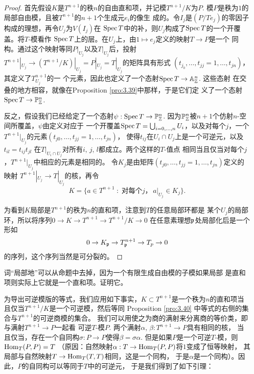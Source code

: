 \begin{proof}
	首先假设$K$是$T^{n+1}$的秩$n$的自由直和项，并记模$T^{n+1}/K$为$P$. 
	模$P$是秩为$1$的局部自由模，且被$T^{n+1}$的$n+1$个生成元$e_i$的像生
	成的。令$I_j$是$(P/Te_j)$的零因子构成的理想，再令$U_j$为$V(I_j)$在
	$\operatorname{Spec} T$中的补，则$U_j$构成了$\operatorname{Spec} T$的一个开覆盖。将$T$-模看作
	$\operatorname{Spec} T$上的层。在$U_j$上，由$1\mapsto e_j$定义的映射$T\to P$是一个
	同构。通过这个映射等同$P|_{U_j}$以及$T|_{U_j}$后，投射$T^{n+1}|_{U_j}
	\to (T^{n+1}/K)|_{U_j}=P|_{U_j}=T|_{U_j}$的矩阵具有形式
	$(t_{j_0},\dots,t_{jj}=1,\dots,t_{jn})$，其定义了$T^{n+1}_{U_j}$的一
	个元素，因此也定义了一个态射$\operatorname{Spec} T\to \mathbb A_{\mathbb{Z}}^n$. 这些态射
	在交叠的地方相容，就像在Proposition \ref{pro:3.39}中那样，于是它们定
	义了一个态射$\operatorname{Spec} T\to \mathbb P_{\mathbb{Z}}^n$.

	反之，假设我们已经给定了一个态射$\psi:\operatorname{Spec} T\to \mathbb P_{\mathbb{Z}}^n$. 
	因为$\mathbb P_{\mathbb{Z}}^n$被$n+1$个仿射$n$-空间所覆盖，$\psi$由定义对应于
	一个开覆盖$\operatorname{Spec} T=\bigcup_{i=0,\dots,n}U_i$，以及对每个$j$，一个
	$T^{n+1}|_{U_j}$的元素$(t_{j0},\dots,t_{jj}=1,\dots,t_{jn})$，
	使得$t_{ij}$在$U_i\cap U_j$上是一个可逆元，以及$t_{il}=t_{ij}t_{jl}$
	在$T|_{U_i\cap U_j}$对所有$i$, $j$, $l$都成立。两个这样的$T$-值点
	相同当且仅当对每个$j$，$T^{n+1}|_{U_j}$中相应的元素是相同的。%
	令$K_j$是由矩阵$(t_{j0},\dots,t_{jj}=1,\dots,t_{jn})$定义的映射
	$T^{n+1}|_{U_j}\to T|_{U_j}$的核，再令
	\[
	K=\{a\in T^{n+1}\;:\; \text{对每个$j$，}\, a|_{U_j}\in K_j\}.
	\]

	为看到$K$局部是$T^{n+1}$的秩为$n$的直和项，注意到$T$的任意局部环都是
	某个$U_j$的局部环，所以将序列$0\to K\to T^{n+1}\to T^{n+1}/K\to 0$
	在任意素理想$\mathfrak{p}$处局部化后是一个形如
	\[
		0\to K_{\mathfrak{p}}\to T^{n+1}_{\mathfrak{p}} \to T_p\to 0
	\]
	的序列，这个序列当然是可分裂的。
\end{proof}

\begin{exe}\label{exe:3.41}
	词“局部地”可以从命题中去掉，因为一个有限生成自由模的子模如果局部
	是直和项则实际上它就是一个直和项。证明它。
\end{exe}

为导出可逆模版的等式，我们应用如下事实，$K\subset T^{n+1}$是一个秩为$n$的直和项当且仅当$T^{n+1}/K$是一个可逆模，然后等同
Proposition \ref{pro:3.40} 中等式的右侧的集合与$T^{n+1}$的可逆商模的集合。
我们可以用使之为商的满射来分离商的等价类，即与满射$T^{n+1}\to P$一起看
可逆$T$-模$P$. 两个满射$\alpha$, $\beta:T^{n+1}\to P$具有相同的核，
当且仅当，存在一个自同构$\sigma:P\to P$使得$\beta=\sigma\alpha$. 
但是如果$P$是一个可逆$T$-模，则$\operatorname{Hom}_T(P,P)=T$
（原因：自然映射$\alpha:T\to \operatorname{Hom}_T(P,P)$将$1$变成了恒等映射，
其局部与自然映射$T\to \operatorname{Hom}_T(T,T)$相同，这是一个同构，
于是$\alpha$是一个同构）。因此，$P$的自同构可以等同于$T$中的可逆元，
于是我们得到了如下引理：

